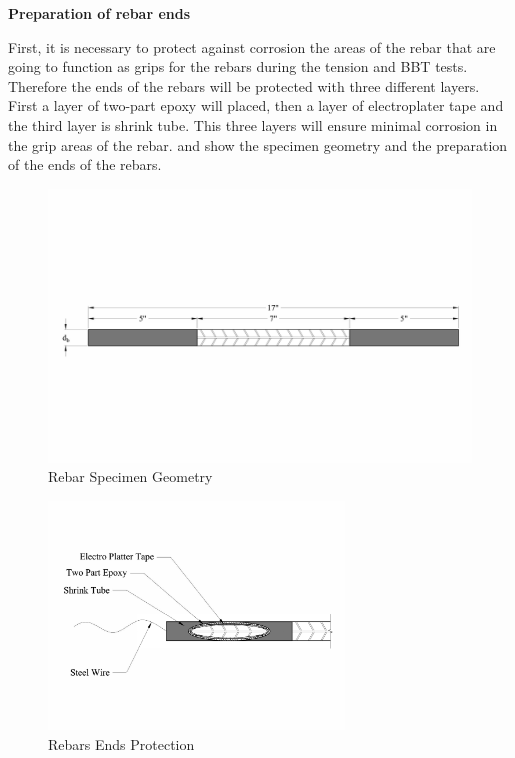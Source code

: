 \textbf{Preparation of rebar ends}

First, it is necessary to protect against corrosion the areas of the rebar that are going to function as grips for the rebars during the tension and BBT tests. Therefore the ends of the rebars will be protected with three different layers. First a layer of two-part epoxy will placed, then a layer of electroplater tape and the third layer is shrink tube. This three layers will ensure minimal corrosion in the grip areas of the rebar.  and  show the specimen geometry and the preparation of the ends of the rebars.
\begin{figure}[htbp]
	\centering
	\includegraphics[width=1.0\textwidth]{Chapter-3/figs/RebarSamples}
	\caption{Rebar Specimen Geometry}
	\label{fig:RebarSpecimenGeomtry}
\end{figure}

\begin{figure}[htbp]
	\centering
	\includegraphics[width=0.7\textwidth]{Chapter-3/figs/Rebar_Ends}
	\caption{Rebars Ends Protection}
	\label{fig:RebarEndsProtection}
\end{figure}

